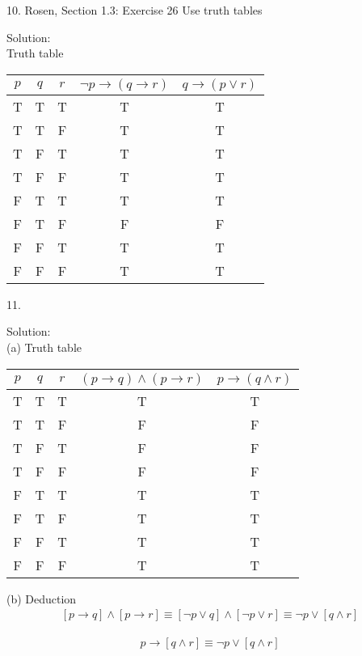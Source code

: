 \documentclass[12pt]{article}
\begin{document}
10. Rosen, Section 1.3: Exercise 26 Use truth tables

\indent Solution:\\
\indent Truth table\\

\begin{center}
\begin{tabular}{c|c|c|c|c}
    $p$ & $q$ & $r$ & $\lnot p \to (q \to r)$ & $q \to (p \lor r)$ \\
\hline
T & T & T & T & T\\
T & T & F & T & T\\
T & F & T & T & T\\
T & F & F & T & T\\
F & T & T & T & T\\
F & T & F & F & F\\
F & F & T & T & T\\
F & F & F & T & T
\end{tabular}
\end{center}

11. 

\indent Solution:\\
\indent (a) Truth table\\
\begin{center}
\begin{tabular}{c|c|c|c|c}
    $p$ & $q$ & $r$ & $(p \to q) \land (p \to r)$ & $p \to (q \land r)$ \\
\hline
T & T & T & T & T \\
T & T & F & F & F \\
T & F & T & F & F \\
T & F & F & F & F \\
F & T & T & T & T \\
F & T & F & T & T \\
F & F & T & T & T \\
F & F & F & T & T
\end{tabular}
\end{center}

\indent (b) Deduction\\
\begin{align}
\label{pImpqAndpImpr}
[p \to q] \land [p \to r] \equiv [\lnot p \lor q] \land [\lnot p \lor r] \equiv \lnot p \lor [q \land r] 
\end{align}

\begin{align}
\label{pImpqAndr}
p \to [q \land r] \equiv \lnot p \lor [q\land r]
\end{align}
\end{document}
